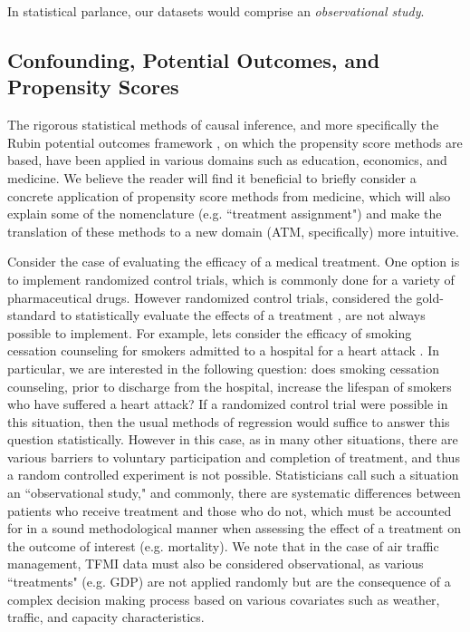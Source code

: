 \documentclass[11pt]{scrartcl}
\begin{document}
In statistical parlance, our datasets would comprise an \emph{observational study}.




\subsection*{Confounding, Potential Outcomes, and Propensity Scores}
The rigorous statistical methods of causal inference, and more specifically the Rubin potential outcomes framework \cite{rubin1974estimating}, on which the propensity score methods are based, have been applied in various domains such as education, economics, and medicine.  We believe the reader will find it beneficial to briefly consider a concrete application of propensity score methods from medicine, which will also explain some of the nomenclature (e.g. ``treatment assignment") and make the translation of these methods to a new domain (ATM, specifically) more intuitive.  

Consider the case of evaluating the efficacy of a medical treatment.  One option is to implement randomized control trials, which is commonly done for a variety of pharmaceutical drugs.  However randomized control trials, considered the gold-standard to statistically evaluate the effects of a treatment \cite{austin2011introduction}, are not always possible to implement.  For example, lets consider the efficacy of smoking cessation counseling for smokers admitted to a hospital for a heart attack \cite{austin2011tutorial}.  In particular, we are interested in the following question: does smoking cessation counseling, prior to discharge from the hospital, increase the lifespan of smokers who have suffered a heart attack?  If a randomized control trial were possible in this situation, then the usual methods of regression would suffice to answer this question statistically.  However in this case, as in many other situations, there are various barriers to voluntary participation and completion of treatment, and thus a random controlled experiment is not possible.  Statisticians call such a situation an ``observational study," and commonly, there are systematic differences between patients who receive treatment and those who do not, which must be accounted for in a sound methodological manner when assessing the effect of a treatment on the outcome of interest (e.g. mortality).  We note that in the case of air traffic management, TFMI data must also be considered observational, as various ``treatments" (e.g. GDP) are not applied randomly but are the consequence of a complex decision making process based on various covariates such as weather, traffic, and capacity characteristics.  
\end{document}
